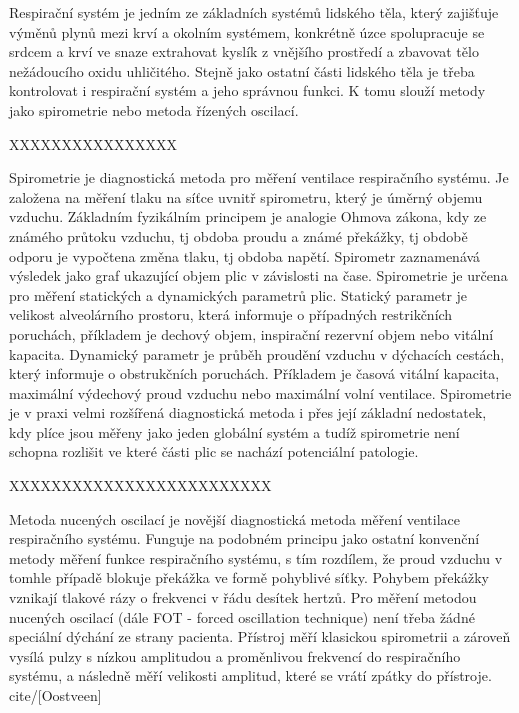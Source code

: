 
Respirační systém je jedním ze základních systémů lidského těla, který zajišťuje výměnů plynů mezi krví a okolním systémem, konkrétně úzce spolupracuje se srdcem a krví ve snaze extrahovat kyslík z vnějšího prostředí a zbavovat tělo nežádoucího oxidu uhličitého. \cite{muni} Stejně jako ostatní části lidského těla je třeba kontrolovat i respirační systém a jeho správnou funkci. K tomu slouží metody jako spirometrie nebo metoda řízených oscilací. 

XXXXXXXXXXXXXXXX


Spirometrie je diagnostická metoda pro měření ventilace respiračního systému. Je založena na měření tlaku na síťce uvnitř spirometru, který je úměrný objemu vzduchu. \cite{MEFANET} Základním fyzikálním principem je analogie Ohmova zákona, kdy ze známého průtoku vzduchu, tj obdoba proudu a známé překážky, tj obdobě odporu je vypočtena změna tlaku, tj obdoba napětí. Spirometr zaznamenává výsledek jako graf ukazující objem plic v závislosti na čase. \cite{Medicon} Spirometrie je určena pro měření statických a dynamických parametrů plic. Statický parametr  je velikost alveolárního prostoru, která informuje o případných restrikčních poruchách, příkladem je dechový objem, inspirační rezervní objem nebo vitální kapacita. Dynamický parametr je průběh proudění vzduchu v dýchacích cestách, který informuje o obstrukčních poruchách. Příkladem je časová vitální kapacita, maximální výdechový proud vzduchu nebo maximální volní ventilace. \cite{lekfak}
Spirometrie je v praxi velmi rozšířená diagnostická metoda i přes její základní nedostatek, kdy plíce jsou měřeny jako jeden globální systém a tudíž spirometrie není schopna rozlišit ve které části plic se nachází potenciální patologie.

XXXXXXXXXXXXXXXXXXXXXXXXX



Metoda nucených oscilací je novější diagnostická metoda měření ventilace respiračního systému. Funguje na podobném principu jako ostatní konvenční metody měření funkce respiračního systému, s tím rozdílem, že proud vzduchu v tomhle případě blokuje překážka ve formě pohyblivé síťky. Pohybem překážky vznikají tlakové rázy o frekvenci v řádu desítek hertzů. Pro měření metodou nucených oscilací (dále FOT - forced oscillation technique) není třeba žádné speciální dýchání ze strany pacienta. Přístroj měří klasickou spirometrii a zároveň vysílá pulzy s nízkou amplitudou a proměnlivou frekvencí do respiračního systému, a následně měří velikosti amplitud, které se vrátí zpátky do přístroje. cite/[Oostveen]

